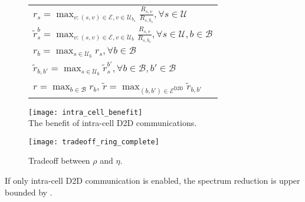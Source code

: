 \begin{figure*}
\begin{minipage}[c]{0.32\linewidth}
 \label{tab:Discrepancy Notations}
\begin{tabular}{|l|}
\hline
\scriptsize{$r_s = \max_{v: (s,v) \in \mathcal{E}, v \in \mathcal{U}_{b_s}} \frac{R_{s,v}}{R_{s,b_s}},
 \forall s \in \mathcal{U}$}
\\%
\scriptsize{$\tilde{r}_s^b = \max_{v: (s,v) \in \mathcal{E}, v \in \mathcal{U}_{b}} \frac{R_{s,v}}{R_{s,b_s}},
 \forall s \in \mathcal{U}, b \in \mathcal{B}$}
\\
\scriptsize{$r_b = \max_{s \in \mathcal{U}_b} r_s, \forall b \in \mathcal{B}$}
\\
\scriptsize{$\tilde{r}_{b,b'} = \max_{s \in \mathcal{U}_b} \tilde{r}_s^{b'}, \forall b \in \mathcal{B}, b' \in \mathcal{B}$}
\\
\scriptsize{$r = \max_{b \in \mathcal{B}}{r_b}$,  $\tilde{r} = \max_{(b,b') \in \mathcal{E}^{\textsf{D2D}}} \tilde{r}_{b,b'}$}
\\
\hline
\end{tabular}
\end{minipage}
\hfill
\begin{minipage}[c]{0.3\linewidth}
  \centering
  \texttt{[image: intra\_cell\_benefit]}\\
  \caption{The benefit of intra-cell D2D communications.}
  \label{fig:intra_cell_benefit}
\end{minipage}
\hfill
\begin{minipage}[c]{0.3\linewidth}
\centering
\texttt{[image: tradeoff\_ring\_complete]}
\caption{\label{fig:tradeoff_ring_complete}  Tradeoff between $\rho$ and $\eta$.}
\end{minipage}
\end{figure*}


\begin{corollary} \label{cor:intra_cell_benefit}
If only intra-cell D2D communication is enabled, the  spectrum reduction is upper bounded by
\be
\rho \le {}.
\ee
\end{corollary}

